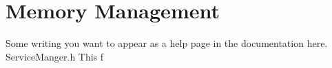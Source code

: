 \hypertarget{overviewpage_memorymanagement}{}\section{Memory Management}\label{overviewpage_memorymanagement}
Some writing you want to appear as a help page in the documentation here. Service\+Manger.\+h This f 